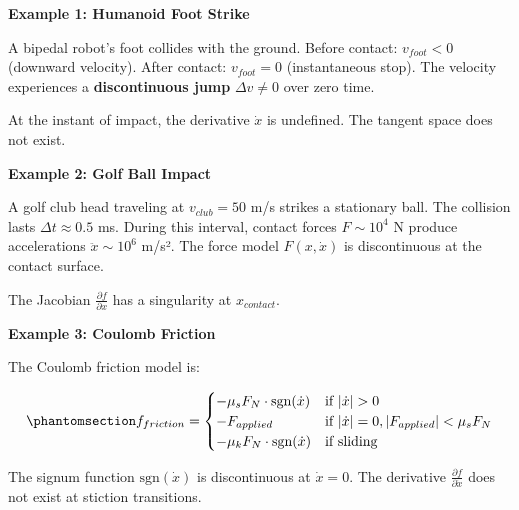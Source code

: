 \documentclass[
  letterpaper,
  DIV=11,
  numbers=noendperiod]{scrartcl}
\begin{document}
\begin{tcolorbox}[enhanced jigsaw, coltitle=black, titlerule=0mm, toprule=.15mm, opacitybacktitle=0.6, left=2mm, opacityback=0, rightrule=.15mm, leftrule=.75mm, breakable, colframe=quarto-callout-warning-color-frame, bottomtitle=1mm, toptitle=1mm, arc=.35mm, title=\textcolor{quarto-callout-warning-color}{\faExclamationTriangle}\hspace{0.5em}{Where Smoothness Breaks Down}, bottomrule=.15mm, colback=white, colbacktitle=quarto-callout-warning-color!10!white]

\textbf{Example 1: Humanoid Foot Strike}

A bipedal robot's foot collides with the ground. Before contact:
\(v_{foot} < 0\) (downward velocity). After contact: \(v_{foot} = 0\)
(instantaneous stop). The velocity experiences a \textbf{discontinuous
jump} \(\Delta v \neq 0\) over zero time.

At the instant of impact, the derivative \(\dot{x}\) is undefined. The
tangent space does not exist.

\textbf{Example 2: Golf Ball Impact}

A golf club head traveling at \(v_{club} = 50\) m/s strikes a stationary
ball. The collision lasts \(\Delta t \approx 0.5\) ms. During this
interval, contact forces \(F \sim 10^4\) N produce accelerations
\(\ddot{x} \sim 10^6\) m/s². The force model \(F(x, \dot{x})\) is
discontinuous at the contact surface.

The Jacobian \(\frac{\partial f}{\partial x}\) has a singularity at
\(x_{contact}\).

\textbf{Example 3: Coulomb Friction}

The Coulomb friction model is:

\begin{equation}\phantomsection\label{eq-coulomb-friction}{
f_{friction} = \begin{cases}
-\mu_s F_N \cdot \text{sgn}(\dot{x}) & \text{if } |\dot{x}| > 0 \\
-F_{applied} & \text{if } |\dot{x}| = 0, |F_{applied}| < \mu_s F_N \\
-\mu_k F_N \cdot \text{sgn}(\dot{x}) & \text{if sliding}
\end{cases}
}\end{equation}

The signum function \(\text{sgn}(\dot{x})\) is discontinuous at
\(\dot{x} = 0\). The derivative \(\frac{\partial f}{\partial \dot{x}}\)
does not exist at stiction transitions.


\end{tcolorbox}
\end{document}
